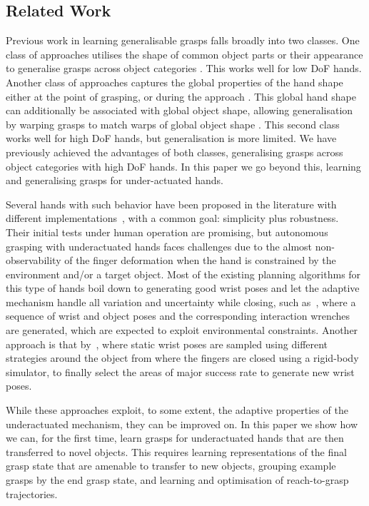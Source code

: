 
\subsection{Related Work}
Previous work in learning generalisable grasps falls broadly into two classes. One class of approaches utilises the shape of common object parts or their appearance to generalise grasps across object categories \cite{saxena2008b,detry2013a,herzog2014a, kroemer2012a}. This works well for low DoF hands. Another class of approaches captures the global properties of the hand shape either at the point of grasping, or during the approach \cite{ben2012generalization}. This global hand shape can additionally be associated with global object shape, allowing generalisation by warping grasps to match warps of global object shape \cite{hillenbrand2012transferring}. This second class works well for high DoF hands, but generalisation is more limited. We have previously achieved the advantages of both classes, generalising grasps across object categories with high DoF hands. In this paper we go beyond this, learning and generalising grasps for under-actuated hands.

Several hands with such behavior have been proposed in the literature with different implementations~\cite{Catalano2014Adaptive, Dollar2010Highly}, with a common goal: simplicity plus robustness. Their initial tests under human operation are promising, but autonomous grasping with underactuated hands faces challenges due to the almost non-observability of the finger deformation when the hand is constrained by the environment and/or a target object. Most of the existing planning algorithms for this type of hands boil down to generating good wrist poses and let the adaptive mechanism handle all variation and uncertainty while closing, such as~\cite{Eppner2015Planning}, where a sequence of wrist and object poses and the corresponding interaction wrenches are generated, which are expected to exploit environmental constraints. Another approach is that by~\cite{Bonilla2015Grasp}, where static wrist poses are sampled using different strategies around the object from where the fingers are closed using a rigid-body simulator, to finally select the areas of major success rate to generate new wrist poses.

While these approaches exploit, to some extent, the adaptive properties of the underactuated mechanism, they can be improved on. In this paper we show how we can, for the first time, learn grasps for underactuated hands that are then transferred to novel objects. This requires learning representations of the final grasp state that are amenable to transfer to new objects, grouping example grasps by the end grasp state, and learning and optimisation of reach-to-grasp trajectories.
